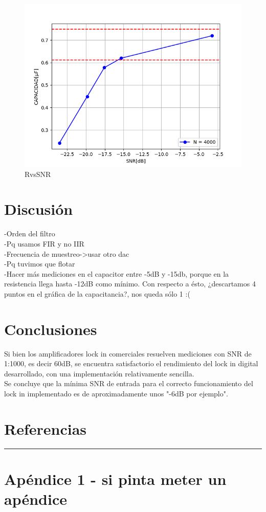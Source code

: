 \documentclass[11pt,a4paper]{extarticle}
\begin{document}
\begin{multicols}{2}
\begin{figure}[H]
	\centering
	\includegraphics[width=\linewidth]{Images/CvsSNR(segunda).png}
	\caption{RvsSNR}
	\label{fig:CvsSNR}
\end{figure}


\section{Discusión}
-Orden del filtro\\
-Pq usamos FIR y no IIR\\
-Frecuencia de muestreo->usar otro dac\\
-Pq tuvimos que flotar\\
-Hacer más mediciones en el capacitor entre -5dB y -15db, 
porque en la resistencia llega hasta -12dB como mínimo.
Con respecto a ésto, ¿descartamos 4 puntos en el gráfica de 
la capacitancia?, nos queda sólo 1 :(

\section{Conclusiones}

Si bien los amplificadores lock in comerciales resuelven 
mediciones con SNR de 1:1000, es decir 60dB,
 se encuentra satisfactorio 
el rendimiento del lock in digital desarrollado, con 
una implementación relativamente sencilla.\\

Se concluye que la mínima SNR de entrada para el 
correcto funcionamiento del lock in implementado es de 
aproximadamente unos "-6dB por ejemplo".

\section{Referencias}




\end{multicols}
\newpage
\begin{appendices}
\vspace{-1em}
\hrule
\vspace{1em}
\normalsize
\section{Apéndice 1 - si pinta meter un apéndice}
\end{appendices}
\end{document}
